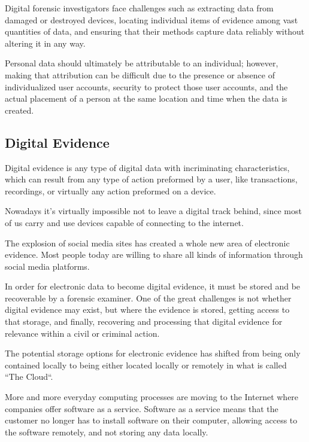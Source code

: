 Digital forensic investigators face challenges such as extracting data from damaged or destroyed
devices, locating individual items of evidence among vast quantities of data,
and ensuring that their methods capture data reliably without altering it in any way.

Personal data should ultimately be attributable to an individual; however, making
that attribution can be difficult due to the presence or absence of individualized
user accounts, security to protect those user accounts, and the actual placement of a
person at the same location and time when the data is created.

\subsection{Digital Evidence}

Digital evidence is any type of digital data with incriminating characteristics,
which can result from any type of action preformed by a user, like transactions,
recordings, or virtually any action preformed on a device.

Nowadays it's virtually impossible not to leave a digital track behind, since most
of us carry and use devices capable of connecting to the internet.

The explosion of social media sites has created a whole new area of electronic
evidence. Most people today are willing to share all kinds of information through
social media platforms.

In order for electronic data to become digital evidence, it must be stored and be recoverable
by a forensic examiner. One of the great challenges is not whether digital
evidence may exist, but where the evidence is stored, getting access to that storage,
and finally, recovering and processing that digital evidence for relevance within
a civil or criminal action.

The potential storage options for electronic evidence has shifted from being only contained locally
to being either located locally or remotely in what is called ``The Cloud``. 

More and more everyday computing processes are moving to the Internet
where companies offer software as a service. Software as a service means that
the customer no longer has to install software on their computer, allowing access to the software remotely,
and not storing any data locally.


